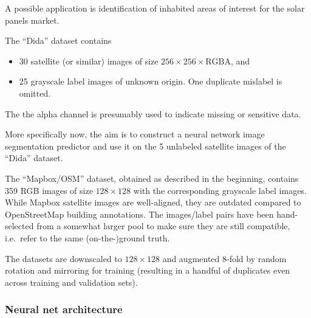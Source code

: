 \documentclass[12pt,a4paper]{article}
\begin{document}
    A possible application is 
    identification of inhabited areas of interest
    for the solar panels market. 
    
    
    The ``Dida'' dataset contains 
    \begin{itemize}
    \item 
        30 satellite (or similar) images of size $256 \times 256 \times \text{RGBA}$,
        and
    \item
        25 grayscale label images of unknown origin.
        One duplicate mislabel is omitted.
    \end{itemize}
    The the alpha channel is  
    presumably used to indicate missing or sensitive data.
    
    
    More specifically now, the aim is to construct a neural network 
    image segmentation predictor
    and
    use it on the 5 unlabeled satellite images
    of the ``Dida'' dataset.
    
    
    The ``Mapbox/OSM'' dataset, obtained as described in the beginning,
    contains 359 RGB images of size $128 \times 128$
    with the corresponding grayscale label images. 
    While Mapbox satellite images are well-aligned,
    they are outdated compared to OpenStreetMap building annotations.
    The images/label pairs have been hand-selected 
    from a somewhat larger pool
    to make sure they are still compatible,
    i.e.~refer to the same (on-the-)ground truth.
    
    
    The datasets are 
    downscaled to $128 \times 128$
    and
    augmented $8$-fold by 
    random rotation and mirroring
    for training
    (resulting in a handful of duplicates even across training and validation sets).

    
    \subsubsection*{Neural net architecture}
    
\end{document}
